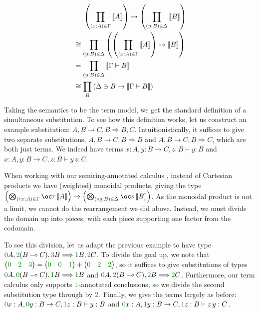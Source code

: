 \begin{align*}
  &\phantom{{}={}} \left(\prod_{(x : A) \in \Gamma}\sem A\right) \to
    \left(\prod_{(y : B) \in \Delta}\sem B\right) \\
  &\cong \prod_{(y : B) \in \Delta}\left(
         \left(\prod_{(x : A) \in \Gamma}\sem A\right) \to \sem B
         \right) \\
  &= \prod_{(y : B) \in \Delta}\sem{\Gamma \vdash B} \\
  &\cong \prod_B\left(\Delta \ni B \to \sem{\Gamma \vdash B}\right)
\end{align*}

Taking the semantics to be the term model, we get the standard definition of a
simultaneous substitution.
To see how this definition works, let us construct an example substitution:
$A, B \to C, B \Longrightarrow B, C$.
Intuitionistically, it suffices to give two separate substitutions,
$A, B \to C, B \Longrightarrow B$ and $A, B \to C, B \Longrightarrow C$,
which are both just terms.
We indeed have terms $x : A, y : B \to C, z : B \vdash y : B$ and
$x : A, y : B \to C, z : B \vdash y\,z : C$.

When working with our semiring-annotated calculus \name{}, instead of Cartesian
products we have (weighted) monoidal products, giving the type
$\left(\bigotimes_{(\gr rx : A) \in \Gamma}\oc \gr r\sem A\right) \to
\left(\bigotimes_{(\gr sy : B) \in \Delta}\oc \gr s\sem B\right)$.
As the monoidal product is not a limit, we cannot do the rearrangement we did
above.
Instead, we must divide the domain up into pieces, with each piece supporting
one factor from the codomain.

To see this division, let us adapt the previous example to have type
$\gr0A, \gr2(B \multimap C), \gr3B \Longrightarrow \gr1B, \gr2C$.
To divide the goal up, we note that $
\begin{pmatrix} \gr0 & \gr2 & \gr3 \end{pmatrix} =
\begin{pmatrix} \gr0 & \gr0 & \gr1 \end{pmatrix} +
\begin{pmatrix} \gr0 & \gr2 & \gr2 \end{pmatrix}
$, so it suffices to give substitutions of types
$\gr0A, \gr0(B \multimap C), \gr1B \Longrightarrow \gr1B$ and
$\gr0A, \gr2(B \multimap C), \gr2B \Longrightarrow \gr2C$.
Furthermore, our term calculus only supports $\gr1$-annotated conclusions,
so we divide the second substitution type through by $\gr2$.
Finally, we give the terms largely as before:
$\gr0x : A, \gr0y : B \to C, \gr1z : B \vdash y : B$ and
$\gr0x : A, \gr1y : B \to C, \gr1z : B \vdash z\,y : C$.

